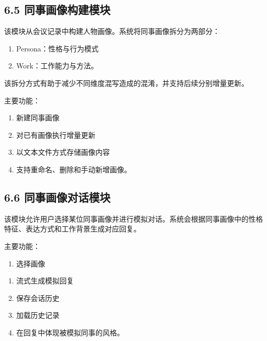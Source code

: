 \documentclass[12pt,a4paper]{article}
\begin{document}
\subsection*{6.5 同事画像构建模块}
\vspace{0.45em}
该模块从会议记录中构建人物画像。系统将同事画像拆分为两部分：\par
\vspace{0.45em}
\begin{enumerate}
\item Persona：性格与行为模式
\item Work：工作能力与方法。
\end{enumerate}
\vspace{0.45em}
该拆分方式有助于减少不同维度混写造成的混淆，并支持后续分别增量更新。\par
\vspace{0.45em}
主要功能：\par
\vspace{0.45em}
\begin{enumerate}
\item 新建同事画像
\item 对已有画像执行增量更新
\item 以文本文件方式存储画像内容
\item 支持重命名、删除和手动新增画像。
\end{enumerate}
\vspace{0.45em}
\subsection*{6.6 同事画像对话模块}
\vspace{0.45em}
该模块允许用户选择某位同事画像并进行模拟对话。系统会根据同事画像中的性格特征、表达方式和工作背景生成对应回复。\par
\vspace{0.45em}
主要功能：\par
\vspace{0.45em}
\begin{enumerate}
\item 选择画像
\end{enumerate}
\newpage
{}
\fancyhead[R]{}
\begin{enumerate}
\item 流式生成模拟回复
\item 保存会话历史
\item 加载历史记录
\item 在回复中体现被模拟同事的风格。
\end{enumerate}
\vspace{0.45em}
\end{document}
